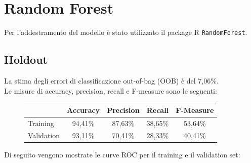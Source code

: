 \section{Random Forest}
Per l'addestramento del modello è stato utilizzato il package R 
\texttt{RandomForest}.

\subsection{Holdout}
La stima degli errori di classificazione out-of-bag (OOB) è del 7,06\%.\\

Le misure di accuracy, precision, recall e F-measure sono le seguenti:
\begin{figure}[H]
	\centering
	\begin{tabular}{lcccc}
		\toprule
		& \textbf{Accuracy} & \textbf{Precision} & \textbf{Recall} & 
		\textbf{F-Measure}  \\
		\midrule
		Training	& 94,41\% & 87,63\% & 38,65\% & 53,64\%    	\\ 
		Validation	& 93,11\% & 70,41\% & 28,33\% & 40,41\%   	\\ 
		\bottomrule
	\end{tabular}
	\label{tab:rf_h_performance}
\end{figure}

Di seguito vengono mostrate le curve ROC per il training e il validation set:

